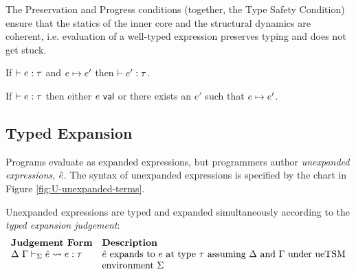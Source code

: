 The Preservation and Progress conditions (together, the {Type Safety} Condition) ensure that the statics of the inner core and the structural dynamics are coherent, i.e. evaluation of a well-typed expression preserves typing and does not get stuck.
\begin{condition}[Preservation]\label{condition:preservation-U} If $\vdash e : \tau$ and $e \mapsto e'$ then $\vdash e' : \tau$. \end{condition}
\begin{condition}[Progress]\label{condition:progress-U} If $\vdash e : \tau$ then either $e~\mathsf{val}$ or there exists an $e'$ such that $e \mapsto e'$. \end{condition}


\subsection{Typed Expansion}\label{sec:typed-expansion-U}
Programs evaluate as expanded expressions, but programmers author \emph{unexpanded expressions}, $\hat{e}$. The syntax of unexpanded expressions is specified by the chart in Figure \ref{fig:U-unexpanded-terms}. 

Unexpanded expressions are typed and expanded simultaneously according to the \emph{typed expansion judgement}:
\[\begin{array}{ll}
\textbf{Judgement Form} & \textbf{Description}\\
\Delta~\Gamma \vdash_{\Sigma} \hat{e} \leadsto e : \tau & \text{$\hat{e}$ expands to $e$ at type $\tau$ assuming $\Delta$ and $\Gamma$ under ueTSM}\\
& \text{environment $\Sigma$}
\end{array}\]

